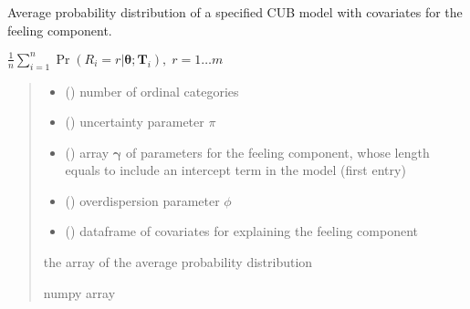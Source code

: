 \documentclass[letterpaper,10pt,english]{sphinxmanual}
\begin{document}
\begin{fulllineitems}
\label{\detokenize{cubmods:cubmods.cube_0w0.pmf}}
\pysigstartsignatures
{}
\pysigstopsignatures
\sphinxAtStartPar
Average probability distribution of a specified CUB model 
with covariates for the feeling component.

\sphinxAtStartPar
\(\frac{1}{n} \sum_{i=1}^n \Pr(R_i=r|\pmb\theta; \pmb T_i),\; r=1 \ldots m\)
\begin{quote}\begin{description}
\begin{itemize}
\item {} 
\sphinxAtStartPar
{} () \textendash{} number of ordinal categories

\item {} 
\sphinxAtStartPar
{} () \textendash{} uncertainty parameter \(\pi\)

\item {} 
\sphinxAtStartPar
{} () \textendash{} array \(\pmb \gamma\) of parameters for the feeling component, whose length equals 
 to include an intercept term in the model (first entry)

\item {} 
\sphinxAtStartPar
{} () \textendash{} overdispersion parameter \(\phi\)

\item {} 
\sphinxAtStartPar
{} () \textendash{} dataframe of covariates for explaining the feeling component

\end{itemize}

\sphinxAtStartPar
the array of the average probability distribution

\sphinxAtStartPar
numpy array

\end{description}\end{quote}

\end{fulllineitems}
\end{document}
